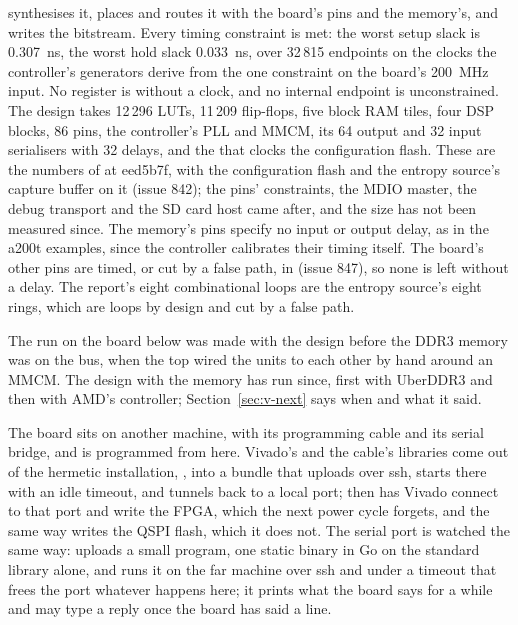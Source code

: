 \documentclass[journal,onecolumn,9pt]{IEEEtran}
\begin{document}
 synthesises it,
places and routes it with the board's pins and the memory's, and
writes the bitstream. Every timing constraint is
met: the worst setup slack is 0.307~ns, the worst hold slack
0.033~ns, over 32\,815 endpoints on the clocks the controller's
generators derive from the one constraint on the board's 200~MHz
input. No register is without a clock, and no internal endpoint is
unconstrained. The design takes 12\,296 LUTs, 11\,209 flip-flops, five
block RAM tiles, four DSP blocks, 86 pins, the controller's PLL and
MMCM, its 64 output and 32 input serialisers with 32 delays, and the
 that clocks the configuration flash. These are the
numbers of  at eed5b7f, with the configuration flash and
the entropy source's capture buffer on it (issue 842); the pins'
constraints, the MDIO master, the debug transport and the SD card
host came after, and the size has not been measured since. The
memory's pins specify no input or output delay, as in the a200t
examples, since the controller calibrates their timing itself. The
board's other pins are timed, or cut by a false path, in
 (issue 847), so none is left without a
delay. The report's
eight combinational loops are the entropy source's eight rings, which
are loops by design and cut by a false path.

The run on the board below was made with the design before the DDR3
memory was on the bus, when the top wired the units to each other by
hand around an MMCM. The design with the memory has run since, first
with UberDDR3 and then with AMD's controller; Section~\ref{sec:v-next}
says when and what it said.

The board sits on another machine, with its programming cable and
its serial bridge, and is programmed from here. Vivado's
 and the cable's libraries come out of the
hermetic installation, , into a bundle that
 uploads over
ssh, starts there with an idle timeout, and tunnels back to a local
port;  then has
Vivado connect to that port and write the FPGA, which the next power
cycle forgets, and  the same way writes
the QSPI flash, which it does not. The serial port is watched the
same way:  uploads
a small program, one static binary in Go on the standard library
alone, and runs it on the far machine over ssh and under a timeout
that frees the port whatever happens here; it prints what the board
says for a while and may type a reply once the board has said a
line.
\end{document}

